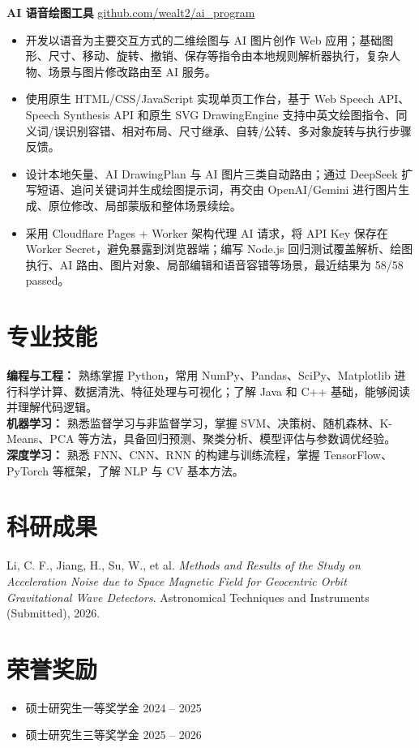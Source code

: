 \documentclass[11pt]{article}
\newcommand{\cvsection}[2]{\section{#2}}
\begin{document}
\textbf{AI 语音绘图工具} \hfill \href{https://github.com/wealt2/ai_program}{github.com/wealt2/ai\_program}
\begin{itemize}
    \item 开发以语音为主要交互方式的二维绘图与 AI 图片创作 Web 应用；基础图形、尺寸、移动、旋转、撤销、保存等指令由本地规则解析器执行，复杂人物、场景与图片修改路由至 AI 服务。
    \item 使用原生 HTML/CSS/JavaScript 实现单页工作台，基于 Web Speech API、Speech Synthesis API 和原生 SVG DrawingEngine 支持中英文绘图指令、同义词/误识别容错、相对布局、尺寸继承、自转/公转、多对象旋转与执行步骤反馈。
    \item 设计本地矢量、AI DrawingPlan 与 AI 图片三类自动路由；通过 DeepSeek 扩写短语、追问关键词并生成绘图提示词，再交由 OpenAI/Gemini 进行图片生成、原位修改、局部蒙版和整体场景续绘。
    \item 采用 Cloudflare Pages + Worker 架构代理 AI 请求，将 API Key 保存在 Worker Secret，避免暴露到浏览器端；编写 Node.js 回归测试覆盖解析、绘图执行、AI 路由、图片对象、局部编辑和语音容错等场景，最近结果为 58/58 passed。
\end{itemize}

\cvsection{\faCogs}{专业技能}

\textbf{编程与工程：} 熟练掌握 Python，常用 NumPy、Pandas、SciPy、Matplotlib 进行科学计算、数据清洗、特征处理与可视化；了解 Java 和 C++ 基础，能够阅读并理解代码逻辑。\\
\textbf{机器学习：} 熟悉监督学习与非监督学习，掌握 SVM、决策树、随机森林、K-Means、PCA 等方法，具备回归预测、聚类分析、模型评估与参数调优经验。\\
\textbf{深度学习：} 熟悉 FNN、CNN、RNN 的构建与训练流程，掌握 TensorFlow、PyTorch 等框架，了解 NLP 与 CV 基本方法。

\cvsection{\faBook}{科研成果}

Li, C. F., Jiang, H., Su, W., et al.  
\textit{Methods and Results of the Study on Acceleration Noise due to Space Magnetic Field for Geocentric Orbit Gravitational Wave Detectors}.  
Astronomical Techniques and Instruments (Submitted), 2026.

\cvsection{\faTrophy}{荣誉奖励}

\begin{itemize}
    \item 硕士研究生一等奖学金 \hfill 2024 -- 2025
    \item 硕士研究生三等奖学金 \hfill 2025 -- 2026
\end{itemize}
\end{document}
